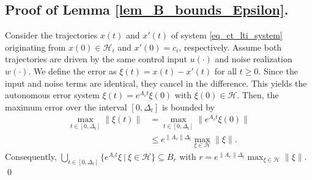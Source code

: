 \documentclass{IEEEtran}
\begin{document}
\begin{appendices}



\section{Proof of Lemma \ref{lem_B_bounds_Epsilon}.}
\label{proof_lem_B_bounds_Epsilon}
Consider the trajectories $x(t)$ and $x'(t)$ of system \eqref{eq_ct_lti_system} originating from $x(0)\in\mathcal{H}_i$ and $x'(0)=c_i$, respectively. Assume both trajectories are driven by the same control input $u(\cdot)$ and noise realization $w(\cdot)$. We define the error as $\xi(t)=x(t)-x'(t)$ for all $t\geq 0$. Since the input and noise terms are identical, they cancel in the difference. This yields the autonomous error system $\xi(t)= e^{A_ct}\xi(0)$ with $\xi(0)\in\mathcal{H}$. Then, the maximum error over the interval $[0,\Delta_t]$ is bounded by
\begin{subequations}
        \begin{align}
            \max_{t\in[0,\Delta_t]}\|\xi(t)\|&=\max_{t\in[0,\Delta_t]}\|e^{A_c t}{\xi}(0)\|\\
            & \leq e^{\|A_c\|\Delta_t}\max_{\xi\in\mathcal{H}}\|\xi\|. 
        \end{align}
\end{subequations} 
Consequently, $\bigcup_{t\in[0,\Delta_t]}\{e^{A_ct}\xi\ | \ \xi\in\mathcal{H}\}\subseteq B_r$ with $r=e^{\|A_c\|\Delta_t}\max_{{\xi}\in\mathcal{H}}\|{\xi}\|$. 
\qed


\end{appendices}
\end{document}
